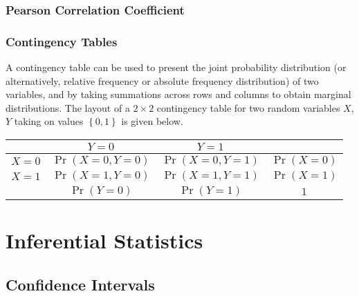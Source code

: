 \documentclass[11pt]{report} %
\begin{document}
\subsubsection{Pearson Correlation Coefficient}

\subsubsection{Contingency Tables}

A contingency table can be used to present the joint probability distribution (or alternatively, relative frequency or absolute frequency distribution) of two variables, and by taking summations across rows and columns to obtain marginal distributions. The layout of a $2\times 2$ contingency table for two random variables $X$, $Y$ taking on values $\left\{0, 1\right\}$ is given below.
\begin{table}[H]\centering
\begin{tabular}{|c||c|c|c|}
\hline 
 & $Y = 0$ & $Y = 1$ & \\
\hline 
\hline 
$X = 0$ & $\operatorname{Pr}\left(X = 0, Y = 0\right)$ &  $\operatorname{Pr}\left(X = 0, Y = 1\right)$ & $\operatorname{Pr}\left(X = 0\right)$ \\
\hline 
$X = 1$ & $\operatorname{Pr}\left(X = 1, Y = 0\right)$ & $\operatorname{Pr}\left(X = 1, Y = 1\right)$ & $\operatorname{Pr}\left(X = 1\right)$ \\
\hline 
 & $\operatorname{Pr}\left(Y = 0\right)$ & $\operatorname{Pr}\left(Y = 1\right)$ & $1$ \\
 \hline
\end{tabular}
\end{table}

\section{Inferential Statistics}

\subsection{Confidence Intervals}
\end{document}
